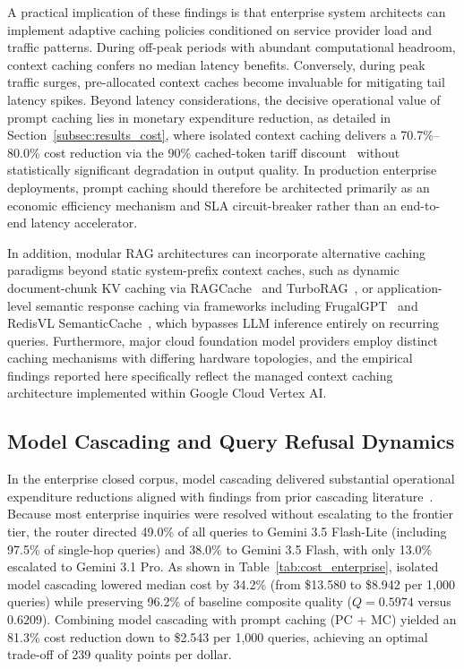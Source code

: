 A practical implication of these findings is that enterprise system architects can implement adaptive caching policies conditioned on service provider load and traffic patterns. During off-peak periods with abundant computational headroom, context caching confers no median latency benefits. Conversely, during peak traffic surges, pre-allocated context caches become invaluable for mitigating tail latency spikes. Beyond latency considerations, the decisive operational value of prompt caching lies in monetary expenditure reduction, as detailed in Section~\ref{subsec:results_cost}, where isolated context caching delivers a 70.7\%--80.0\% cost reduction via the 90\% cached-token tariff discount~\citep{GoogleVertexAIPricing} without statistically significant degradation in output quality. In production enterprise deployments, prompt caching should therefore be architected primarily as an economic efficiency mechanism and SLA circuit-breaker rather than an end-to-end latency accelerator.

In addition, modular RAG architectures can incorporate alternative caching paradigms beyond static system-prefix context caches, such as dynamic document-chunk KV caching via RAGCache~\citep{jin2025ragcache} and TurboRAG~\citep{lu2025turborag}, or application-level semantic response caching via frameworks including FrugalGPT~\citep{chen2024frugalgpt} and RedisVL SemanticCache~\citep{RedisVLSemanticCache}, which bypasses LLM inference entirely on recurring queries. Furthermore, major cloud foundation model providers employ distinct caching mechanisms with differing hardware topologies, and the empirical findings reported here specifically reflect the managed context caching architecture implemented within Google Cloud Vertex AI.

\subsection{Model Cascading and Query Refusal Dynamics}
\label{subsec:disc_model_cascading}

In the enterprise closed corpus, model cascading delivered substantial operational expenditure reductions aligned with findings from prior cascading literature~\citep{chen2024frugalgpt, ong2025routellm}. Because most enterprise inquiries were resolved without escalating to the frontier tier, the router directed 49.0\% of all queries to Gemini 3.5 Flash-Lite (including 97.5\% of single-hop queries) and 38.0\% to Gemini 3.5 Flash, with only 13.0\% escalated to Gemini 3.1 Pro. As shown in Table~\ref{tab:cost_enterprise}, isolated model cascading lowered median cost by 34.2\% (from \$13.580 to \$8.942 per 1,000 queries) while preserving 96.2\% of baseline composite quality ($Q = 0.5974$ versus $0.6209$). Combining model cascading with prompt caching (PC + MC) yielded an 81.3\% cost reduction down to \$2.543 per 1,000 queries, achieving an optimal trade-off of 239 quality points per dollar.

